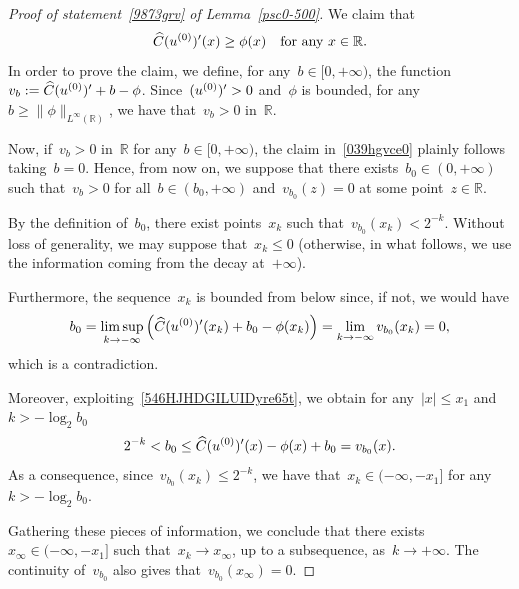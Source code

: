 \documentclass[10pt,a4paper]{amsart}
\numberwithin{equation}{section}
\newcommand{\R}{\mathbb{R}}
\begin{document}
\begin{proof}[Proof of statement~\eqref{9873grv} of Lemma~\ref{psc0-500}]
We claim that
\begin{equation}\label{039hgvce0}
\widehat{C} (u^{(0)})\rq{} (x) \geq \phi(x) \quad\mbox{for any } x \in \R.
\end{equation}
In order to prove the claim, we define, for any~$b \in [0,+\infty)$, the function~${v_b:= \widehat{C} (u^{(0)})\rq{}+b-\phi}$.
Since~$(u^{(0)})\rq{}>0$ and~$\phi$ is bounded, for any~$b\ge \|\phi\|_{L^\infty(\R)}$, we have that~$v_b>0$ in~$\R$.

Now, if~$v_b > 0$ in~$\R$ for any~$b \in [0,+\infty)$, the claim in~\eqref{039hgvce0} plainly follows taking~$b=0$. Hence, from now on, we suppose that there exists~$b_0\in(0,+\infty)$
such that~$v_b>0$ for all~$b\in(b_0,+\infty)$ and~$v_{b_0}(z)=0$ at some point~$z\in\R$.

By the definition of~$b_0$, there exist points~$x_k$ such that~$v_{b_0}(x_k)< 2^{-k}$. Without loss of generality, we may suppose that~$x_k\leq 0$ (otherwise,
in what follows, we use the information coming from the decay at~$+\infty$).

Furthermore, the sequence~$x_k$ is bounded from below since, if not, we would have
\begin{equation*}
b_0 = \limsup_{k \to -\infty} \left( \widehat{C} (u^{(0)})\rq{}(x_k)+b_0 - \phi(x_k) \right) = \lim_{k \to -\infty} v_{b_0}(x_k) = 0,
\end{equation*}
which is a contradiction. 

Moreover, exploiting~\eqref{546HJHDGILUIDyre65t}, we obtain for any~$ |x | \leq x_1$ and~$k > -\log_{2}b_0$ 
\begin{equation*}
 2^{-k} < b_0 \leq \widehat{C} (u^{(0)})\rq{} (x) - \phi(x)+b_0 = v_{b_0}(x).
\end{equation*}
As a consequence, since~$v_{b_0}(x_k)\leq 2^{-k}$, we have that~$x_k\in (-\infty, -x_1]$ for any~$k > -\log_{2} b_0 $.

Gathering these pieces of information,
we conclude that there exists~$x_{\infty} \in (-\infty, -x_1]$ such that~$x_k \to x_{\infty}$, up to a subsequence, as~$k\to+\infty$. 
The continuity of~$v_{b_0}$ also gives that~$v_{b_0}({x_{\infty}})=0$.


\end{proof}
\end{document}
